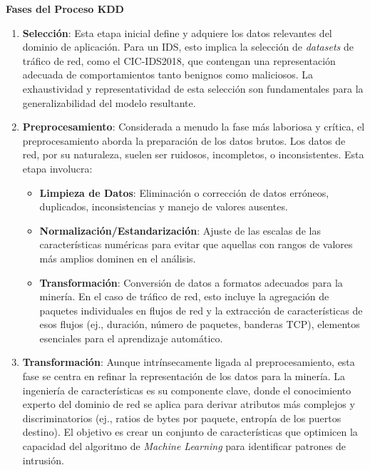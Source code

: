 \textbf{Fases del Proceso KDD}
\begin{enumerate}

    \item\textbf{Selección}: Esta etapa inicial define y adquiere los datos relevantes del dominio de aplicación. Para un IDS, esto implica la selección de \textit{datasets} de tráfico de red, como el CIC-IDS2018, que contengan una representación adecuada de comportamientos tanto benignos como maliciosos. La exhaustividad y representatividad de esta selección son fundamentales para la generalizabilidad del modelo resultante.
    
    \item\textbf{Preprocesamiento}: Considerada a menudo la fase más laboriosa y crítica, el preprocesamiento aborda la preparación de los datos brutos. Los datos de red, por su naturaleza, suelen ser ruidosos, incompletos, o inconsistentes. Esta etapa involucra:
    \begin{itemize}

        \item\textbf{Limpieza de Datos}: Eliminación o corrección de datos erróneos, duplicados, inconsistencias y manejo de valores ausentes.
        
        \item\textbf{Normalización/Estandarización}: Ajuste de las escalas de las características numéricas para evitar que aquellas con rangos de valores más amplios dominen en el análisis.
        
        \item\textbf{Transformación}: Conversión de datos a formatos adecuados para la minería. En el caso de tráfico de red, esto incluye la agregación de paquetes individuales en flujos de red y la extracción de características de esos flujos (ej., duración, número de paquetes, banderas TCP), elementos esenciales para el aprendizaje automático.
          
    \end{itemize}
    \item\textbf{Transformación}: Aunque intrínsecamente ligada al preprocesamiento, esta fase se centra en refinar la representación de los datos para la minería. La ingeniería de características es su componente clave, donde el conocimiento experto del dominio de red se aplica para derivar atributos más complejos y discriminatorios (ej., ratios de bytes por paquete, entropía de los puertos destino). El objetivo es crear un conjunto de características que optimicen la capacidad del algoritmo de \textit{Machine Learning} para identificar patrones de intrusión.
    

\end{enumerate}
